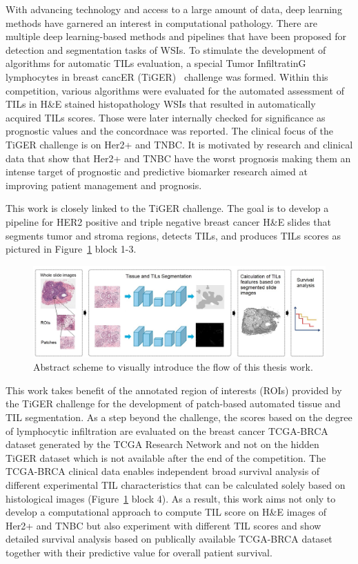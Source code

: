 With advancing technology and access to a large amount of data, deep learning
methods have garnered an interest in computational pathology. 
There are multiple deep learning-based methods and pipelines that have been
proposed for detection and segmentation tasks of WSIs. 
To stimulate the development of algorithms for automatic TILs evaluation,
a special Tumor InfiltratinG lymphocytes in breast cancER (TiGER)~\cite{home}
challenge was formed. Within this competition, various algorithms were
evaluated for the automated assessment of TILs in H\&E stained
histopathology WSIs that resulted in automatically acquired TILs scores.
Those were later internally checked for significance as prognostic values
and the concordnace was reported.
The clinical focus of the TiGER challenge is on Her2+ and TNBC.
It is motivated by research and clinical data that show that Her2+
and TNBC have the worst prognosis making them an intense target of
prognostic and predictive biomarker research aimed at improving patient
management and prognosis.

This work is closely linked to the TiGER challenge. The goal is to develop a pipeline
for HER2 positive and triple negative breast cancer H\&E slides
that segments tumor and stroma regions, detects TILs, and produces TILs scores
as pictured in Figure~\ref*{fig:workflow} block 1-3.
\begin{figure}[H]
    \includegraphics[width=\linewidth]{figures/overview.jpg}
    \caption{Abstract scheme to visually introduce the flow of this thesis work.}
    \label{fig:workflow}
\end{figure}
This work takes benefit of the annotated region of interests (ROIs) provided by the TiGER challenge
for the development of patch-based automated tissue and TIL segmentation.
As a step beyond the challenge, the scores based on the degree of lymphocytic
infiltration are evaluated on the breast cancer TCGA-BRCA dataset generated by
the TCGA Research Network and not on the hidden TiGER dataset which is not available
after the end of the competition.
The TCGA-BRCA clinical data enables independent broad survival analysis of different experimental
TIL characteristics that can be calculated solely based on histological images (Figure~\ref*{fig:workflow} block 4). 
As a result, this work aims not only to develop a computational approach
to compute TIL score on H\&E images of Her2+ and TNBC but also experiment
with different TIL scores and show detailed survival analysis based on publically available
TCGA-BRCA dataset together with their predictive value for overall patient survival. 
